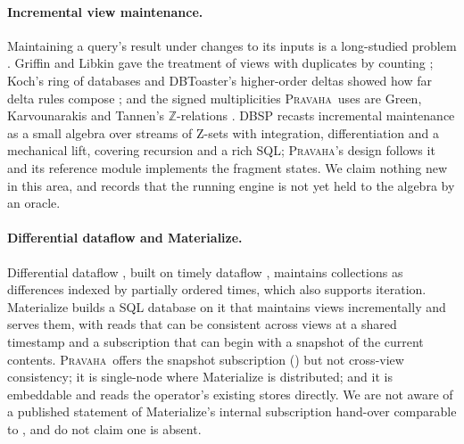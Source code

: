 \documentclass[11pt,a4paper]{article}
\renewcommand{\_}{\oldunderscore\allowbreak}
\newcommand{\Pv}{\textsc{Pravaha}}
\newcommand{\Z}{\mathbb{Z}}
\begin{document}
\paragraph{Incremental view maintenance.} Maintaining a query's result under changes to its inputs is a
long-studied problem \cite{blakeley1986,gupta1995}. Griffin and Libkin gave the treatment of views with
duplicates by counting \cite{griffin1995}; Koch's ring of databases and DBToaster's higher-order deltas
showed how far delta rules compose \cite{koch2010,dbtoaster2012}; and the signed multiplicities \Pv\ uses
are Green, Karvounarakis and Tannen's $\Z$-relations \cite{green2007,green2009}. DBSP \cite{dbsp2023}
recasts incremental maintenance as a small algebra over streams of Z-sets with integration,
differentiation and a mechanical lift, covering recursion and a rich SQL; \Pv's design follows it and
its reference module implements the fragment  states. We claim nothing new in this area,
and  records that the running engine is not yet held to the algebra by an oracle.

\paragraph{Differential dataflow and Materialize.} Differential dataflow \cite{mcsherry2013}, built on
timely dataflow \cite{naiad2013}, maintains collections as differences indexed by partially ordered
times, which also supports iteration. Materialize \cite{materialize} builds a SQL database on it that
maintains views incrementally and serves them, with reads that can be consistent across views at a
shared timestamp and a subscription that can begin with a snapshot of the current contents. \Pv\ offers
the snapshot subscription () but not cross-view consistency; it is single-node where
Materialize is distributed; and it is embeddable and reads the operator's existing stores directly. We
are not aware of a published statement of Materialize's internal subscription hand-over comparable to
, and do not claim one is absent.
\end{document}
